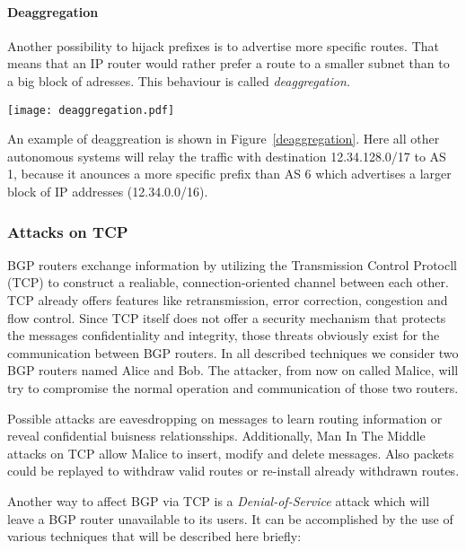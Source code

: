 \documentclass[12pt,a4paper]{IEEEtran}
\begin{document}
		\paragraph{Deaggregation}
		Another possibility to hijack prefixes is to advertise more specific routes. That means that an IP router would rather prefer a route to a smaller subnet than to a big block of adresses. This behaviour is called \emph{deaggregation.} 
		
		\begin{figure*}[ht!]
			\begin{center}
				\texttt{[image: deaggregation.pdf]}
			\end{center}
			\caption{Prefix hijacking by deaggregation}
			\label{deaggregation}
		\end{figure*}
		An example of deaggreation is shown in \mbox{Figure \ref{deaggregation}}. Here all other autonomous systems will relay the traffic with destination 12.34.128.0/17 to AS 1, because it anounces a more specific prefix than AS 6 which advertises a larger block of IP addresses (12.34.0.0/16).
		
	       	\subsubsection{Attacks on TCP}
		BGP routers exchange information by utilizing the Transmission Control Protocll (TCP) to construct a realiable, connection-oriented channel between each other. 
		TCP already offers features like retransmission, error correction, congestion and flow control. 
		Since TCP itself does not offer a security mechanism that protects the messages confidentiality and integrity, those threats obviously exist for the communication between BGP routers. 
		In all described techniques we consider two BGP routers named Alice and Bob. The attacker, from now on called Malice, will try to compromise the normal operation and communication of those two routers.

		Possible attacks are eavesdropping on messages to learn routing information or reveal confidential buisness relationsships.
		Additionally, Man In The Middle attacks on TCP allow Malice to insert, modify and delete messages. 
		Also packets could be replayed to withdraw valid routes or re-install already withdrawn routes.
	
		Another way to affect BGP via TCP is a \emph{Denial-of-Service} attack which will leave a BGP router unavailable to its users.
		It can be accomplished by the use of various techniques that will be described here briefly:
\end{document}
